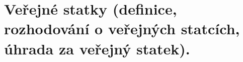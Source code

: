 \clearpage
\section{Veřejné statky (definice, rozhodování o veřejných statcích, úhrada za veřejný statek).}